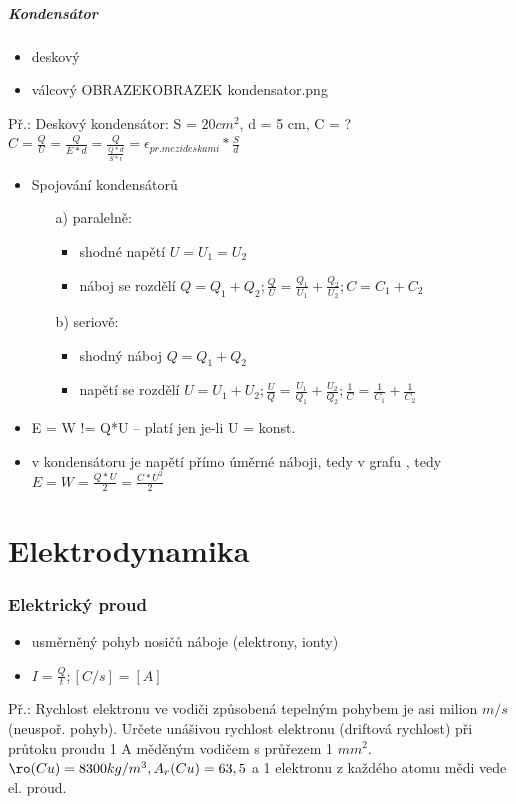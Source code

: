 \documentclass{article}
\begin{document}
\subsubsection{Kondensátor}
\begin{itemize}
  \item deskový
  \item válcový OBRAZEKOBRAZEK kondensator.png
\end{itemize}
Př.: Deskový kondensátor: S = $20 cm^2$, d = 5 cm, C = ?\\
$C = \frac{Q}{U}=\frac{Q}{E*d}=\frac{Q}{\frac{Q*d}{S*\epsilon}} = \epsilon_{pr. mezi deskami} * \frac{S}{d}$
\begin{itemize}
  \item Spojování kondensátorů
  \begin{itemize}
    \item[a)] paralelně:
    \begin{itemize}
      \item shodné napětí $U = U_1 = U_2$
      \item náboj se rozdělí $Q = Q_1 + Q_2; \frac{Q}{U} = \frac{Q_1}{U_1} + \frac{Q_2}{U_2}; C = C_1 + C_2$
    \end{itemize}
    \item[b)] seriově:
    \begin{itemize}
      \item shodný náboj $Q = Q_1 + Q_2$
      \item napětí se rozdělí $U = U_1 + U_2; \frac{U}{Q} = \frac{U_1}{Q_1} + \frac{U_2}{Q_2}; \frac{1}{C} = \frac{1}{C_1} + \frac{1}{C_2}$
    \end{itemize}
  \end{itemize}
  \item E = W != Q*U -- platí jen je-li U = konst.
  \item v kondensátoru je napětí přímo úměrné náboji, tedy v grafu , tedy $E = W = \frac{Q*U}{2} = \frac{C*U^2}{2}$
\end{itemize}

\part{Elektrodynamika}
\section{Elektrický proud}
\begin{itemize}
  \item usměrněný pohyb nosičů náboje (elektrony, ionty)
  \item $I = \frac{Q}{t}; [C/s] = [A]$
\end{itemize}
Př.: Rychlost elektronu ve vodiči způsobená tepelným pohybem je asi milion $m/s$ (neuspoř. pohyb). Určete unášivou rychlost elektronu (driftová rychlost) při průtoku proudu 1 A měděným vodičem s průřezem 1 $mm^2$. $\ro (Cu) = 8300 kg/ m^3, A_r (Cu) = 63,5$ a 1 elektronu z každého atomu mědi vede el. proud.
\end{document}
